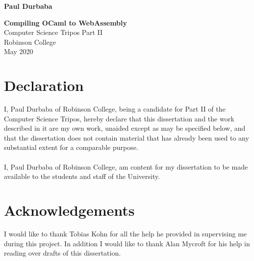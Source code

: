 \documentclass[12pt,notitlepage]{report}
\newcommand\note[1]{}
\begin{document}


\pagestyle{empty}

\hfill{\LARGE \bf Paul Durbaba}

\vspace*{60mm}
\begin{center}
\Huge
{\bf Compiling OCaml to WebAssembly} \\
\vspace*{5mm}
Computer Science Tripos Part II \\
\vspace*{5mm}
Robinson College \\
\vspace*{5mm}
May 2020  %
\end{center}

\clearpage


 
\newpage
\section*{Declaration}

I, Paul Durbaba of Robinson College, being a candidate for Part II of the Computer
Science Tripos, hereby declare
that this dissertation and the work described in it are my own work,
unaided except as may be specified below, and that the dissertation
does not contain material that has already been used to any substantial
extent for a comparable purpose.
\\\\
I, Paul Durbaba of Robinson College, am content for my dissertation to be made available to the students and staff of the University.

\bigskip
{}

\medskip
{}

\section*{Acknowledgements}

I would like to thank Tobias Kohn for all the help he provided in supervising me during this project. In addition I would like to thank Alan Mycroft for his help in reading over drafts of this dissertation.

\end{document}
